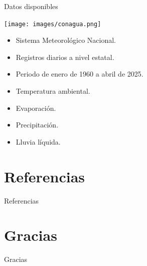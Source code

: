 \documentclass[aspectratio=169]{beamer}
\begin{document}
\begin{frame}{Datos disponibles}
    \vspace{-1cm}
    \begin{minipage}{0.5\textwidth}
			\hspace{-0.5cm}
            \centering
            \texttt{[image: images/conagua.png]}
		\end{minipage}%
		\begin{minipage}{0.5\textwidth}
            \begin{block}{}
                \begin{itemize}
                    \item Sistema Meteorológico Nacional.
				\item Registros diarios a nivel estatal.
                    \item Periodo de enero de 1960 a abril de 2025.
                    \item Temperatura ambiental.
                    \item Evaporación.
                    \item Precipitación.
                    \item Lluvia líquida.
			\end{itemize}
            \end{block}
		\end{minipage}
\end{frame}



\section*{Referencias}
\begin{frame}{Referencias}
	\vspace*{-1cm}
	\tiny
	
	
	\nocite{*}
\end{frame}

\section*{Gracias}
\begin{frame}[noframenumbering]
     \begin{center}
	    \Huge{Gracias}
	\end{center}
    \end{frame}
    
\end{document}
